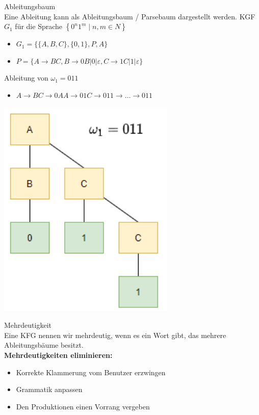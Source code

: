 \begin{definition}{Ableitungsbaum}\\
    Eine Ableitung kann als Ableitungsbaum / Parsebaum dargestellt werden. KGF $G_{1}$ für die Sprache $\left\{0^{n} 1^{m} \mid n, m \in N\right\}$

    \begin{itemize}
    \item $G_{1}=\{\{A, B, C\},\{0,1\}, P, A\}$
    \item $P=\{A \rightarrow B C, B \rightarrow 0 B|0| \varepsilon, C \rightarrow 1 C|1| \varepsilon\}$
    \end{itemize}

    Ableitung von $\omega_{1}=011$

    \begin{itemize}
    \item $A \rightarrow B C \rightarrow 0 A A \rightarrow 01 C \rightarrow 011 \rightarrow \ldots \rightarrow 011$
    \end{itemize}
    \includegraphics[width=0.3\linewidth]{images/ableitungsbaum.png}
\end{definition}

\begin{concept}{Mehrdeutigkeit}\\
    Eine KFG nennen wir mehrdeutig, wenn es ein Wort gibt, das mehrere Ableitungsbäume besitzt.\\
    \textbf{Mehrdeutigkeiten eliminieren:}
    \begin{itemize}
    \item Korrekte Klammerung vom Benutzer erzwingen
    \item Grammatik anpassen
    \item Den Produktionen einen Vorrang vergeben
    \end{itemize}
\end{concept}


